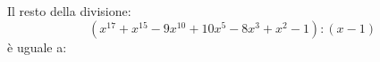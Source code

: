 Il resto della divisione:
$$(x^{17} + x^{15} - 9x^{10} + 10x^{5} - 8x^3 + x^2 - 1) : (x - 1)$$
è uguale a:
